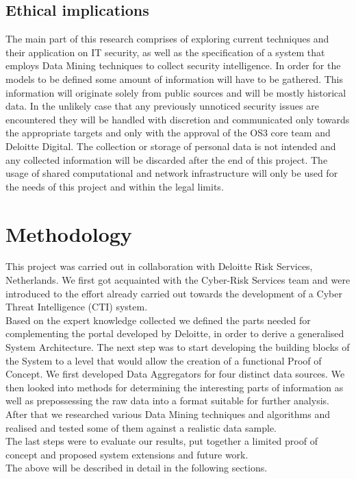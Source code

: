 \documentclass[12pt]{article}
\begin{document}
\subsection{Ethical implications}

The main part of this research comprises of exploring current techniques and their application on IT security, as well as the specification of a system that employs Data Mining techniques to collect security intelligence. In order for the models to be defined some amount of information will have to be gathered. This information will originate solely from public sources and will be mostly historical data. In the unlikely case that any previously unnoticed security issues are encountered they will be handled with discretion and communicated only towards the appropriate targets and only with the approval of the OS3 core team and Deloitte Digital. The collection or storage of personal data is not intended and any collected information will be discarded after the end of this project. The usage of shared computational and network infrastructure will only be used for the needs of this project and within the legal limits.

\newpage
\section{Methodology}
This project was carried out in collaboration with Deloitte Risk Services, Netherlands. We first got acquainted with the Cyber-Risk Services team and were introduced to the effort already carried out towards the development of a Cyber Threat Intelligence (CTI) system. \\
Based on the expert knowledge collected we defined the parts needed for complementing the portal developed by Deloitte, in order to derive a generalised System Architecture. The next step was to start developing the building blocks of the System to a level that would allow the creation of a functional Proof of Concept. We first developed Data Aggregators for four distinct data sources. We then looked into methods for determining the interesting parts of information as well as prepossessing the raw data into a format suitable for further analysis. After that we researched various Data Mining techniques and algorithms and realised and tested some of them against a realistic data sample. \\
The last steps were to evaluate our results, put together a limited proof of concept and proposed system extensions and future work. \\
The above will be described in detail in the following sections. 
\end{document}
